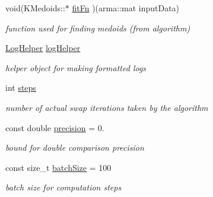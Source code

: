 \begin{DoxyCompactItemize}
void(K\+Medoids\+::$\ast$ \hyperlink{classKMedoids_ac36a9e6347281ff72dc3ccd677f8c45a}{fit\+Fn} )(arma\+::mat input\+Data)
\begin{DoxyCompactList}\small\item\em function used for finding medoids (from algorithm) \end{DoxyCompactList}\item 
\mbox{\label{classKMedoids_a3c2f6a89220d392c50f4791dd6f5773b}} 
\hyperlink{structLogHelper}{Log\+Helper} \hyperlink{classKMedoids_a3c2f6a89220d392c50f4791dd6f5773b}{log\+Helper}
\begin{DoxyCompactList}\small\item\em helper object for making formatted logs \end{DoxyCompactList}\item 
\mbox{\label{classKMedoids_a48502b4eca5c4eea065659afde6abb53}} 
int \hyperlink{classKMedoids_a48502b4eca5c4eea065659afde6abb53}{steps}
\begin{DoxyCompactList}\small\item\em number of actual swap iterations taken by the algorithm \end{DoxyCompactList}\item 
\mbox{\label{classKMedoids_a8777933aacdc528fc4ac18d47fd3fa29}} 
const double \hyperlink{classKMedoids_a8777933aacdc528fc4ac18d47fd3fa29}{precision} = 0.
\begin{DoxyCompactList}\small\item\em bound for double comparison precision \end{DoxyCompactList}\item 
\mbox{\label{classKMedoids_abe265fbf9b607f20544b9b32e923a893}} 
const size\+\_\+t \hyperlink{classKMedoids_abe265fbf9b607f20544b9b32e923a893}{batch\+Size} = 100
\begin{DoxyCompactList}\small\item\em batch size for computation steps \end{DoxyCompactList}\end{DoxyCompactItemize}
